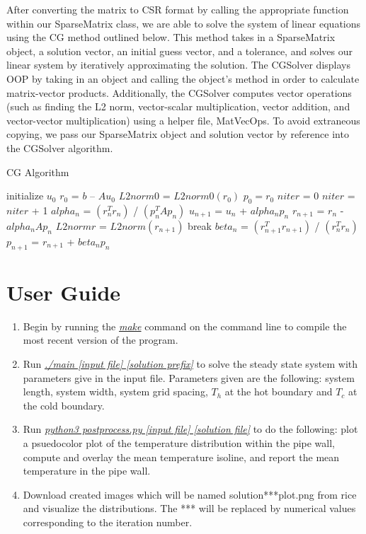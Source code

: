 \documentclass{article}
\begin{document}
After converting the matrix to CSR format by calling the appropriate function within our SparseMatrix class, we are able to solve the system of linear equations using the CG method outlined below. This method takes in a SparseMatrix object, a solution vector, an initial guess vector, and a tolerance, and solves our linear system by iteratively approximating the solution. The CGSolver displays OOP by taking in an object and calling the object's method in order to calculate matrix-vector products. Additionally, the CGSolver computes vector operations (such as finding the L2 norm, vector-scalar multiplication, vector addition, and vector-vector multiplication) using a helper file, MatVecOps. To avoid extraneous copying, we pass our SparseMatrix object and solution vector by reference into the CGSolver algorithm. \cite{CME211:2021:FinalProjectPart2}
\begin{center}
\begin{algorithm}[H]
\SetAlgoLined
\caption{CG Algorithm}\label{alg:two}
initialize $u_0$\;
$r_0$ = $b$ – $Au_0$\;
$L2norm0$ = $L2norm0(r_0)$\;
$p_0 = r_0$\;
$niter$ = 0\;
 {
    $niter$ = $niter$ + 1\;
    $alpha_n$ = $(r_n^{T} r_n)$ / $(p_n^{T}Ap_n)$\;
    $u_{n+1}$ = $u_n$ + $alpha_n p_n$\;
    $r_{n+1}$ = $r_n$ - $alpha_n Ap_n$\;
    $L2normr$ = $L2norm(r_{n+1})$\;
     {
        break\;
    }
    $beta_n$ = $(r_{n+1}^{T} r_{n+1})$ / $(r_n^{T} r_n)$\;
    $p_{n+1}$ = $r_{n+1}$ + $beta_np_n$\;
}
\end{algorithm}
\end{center}
\section{User Guide}
\begin{enumerate}
    \item Begin by running the \underline{\emph{make}} command on the command line to compile the most recent version of the program.
    \item Run \underline{\emph{./main [input file] [solution prefix]}} to solve the steady state system with parameters give in the input file. Parameters given are the following: system length, system width, system grid spacing, $T_h$ at the hot boundary and $T_c$ at the cold boundary.
    \item Run \underline{\emph{python3 postprocess.py [input file] [solution file]}} to do the following: plot a psuedocolor plot of the temperature distribution within the pipe wall, compute and overlay the mean temperature isoline, and report the mean temperature in the pipe wall.
    \item Download created images which will be named solution***plot.png from rice and visualize the distributions. The *** will be replaced by numerical values corresponding to the iteration number.
\end{enumerate}
\end{document}

